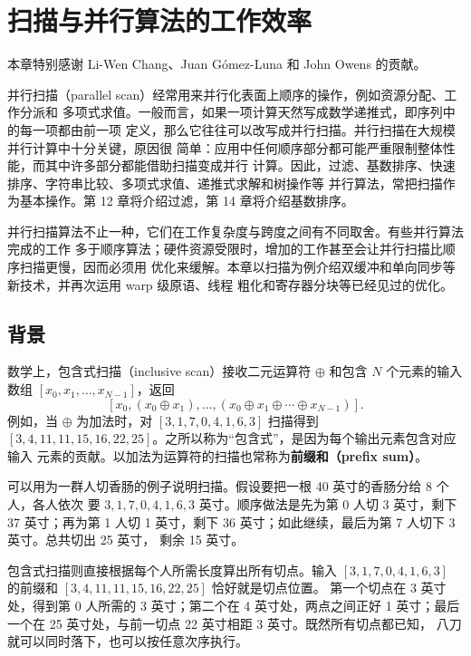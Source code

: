 \chapter{扫描与并行算法的工作效率}
\label{chap:scan}
\chaptercontents

\setcounter{footnote}{0}

本章特别感谢 Li-Wen Chang、Juan G\'omez-Luna 和 John Owens 的贡献。

并行扫描（parallel scan）经常用来并行化表面上顺序的操作，例如资源分配、工作分派和
多项式求值。一般而言，如果一项计算天然写成数学递推式，即序列中的每一项都由前一项
定义，那么它往往可以改写成并行扫描。并行扫描在大规模并行计算中十分关键，原因很
简单：应用中任何顺序部分都可能严重限制整体性能，而其中许多部分都能借助扫描变成并行
计算。因此，过滤、基数排序、快速排序、字符串比较、多项式求值、递推式求解和树操作等
并行算法，常把扫描作为基本操作。第 12 章将介绍过滤，第 14 章将介绍基数排序。

并行扫描算法不止一种，它们在工作复杂度与跨度之间有不同取舍。有些并行算法完成的工作
多于顺序算法；硬件资源受限时，增加的工作甚至会让并行扫描比顺序扫描更慢，因而必须用
优化来缓解。本章以扫描为例介绍双缓冲和单向同步等新技术，并再次运用 warp 级原语、线程
粗化和寄存器分块等已经见过的优化。

\section{背景}
\label{sec:scan-background}

数学上，包含式扫描（inclusive scan）接收二元运算符 $\oplus$ 和包含 $N$ 个元素的输入
数组 $[x_0,x_1,\ldots,x_{N-1}]$，返回
\[
 [x_0,(x_0\oplus x_1),\ldots,(x_0\oplus x_1\oplus\cdots\oplus x_{N-1})].
\]
例如，当 $\oplus$ 为加法时，对 $[3,1,7,0,4,1,6,3]$ 扫描得到
$[3,4,11,11,15,16,22,25]$。之所以称为“包含式”，是因为每个输出元素包含对应输入
元素的贡献。以加法为运算符的扫描也常称为\textbf{前缀和（prefix sum）}。

可以用为一群人切香肠的例子说明扫描。假设要把一根 40 英寸的香肠分给 8 个人，各人依次
要 $3,1,7,0,4,1,6,3$ 英寸。顺序做法是先为第 0 人切 3 英寸，剩下 37 英寸；再为第 1
人切 1 英寸，剩下 36 英寸；如此继续，最后为第 7 人切下 3 英寸。总共切出 25 英寸，
剩余 15 英寸。

包含式扫描则直接根据每个人所需长度算出所有切点。输入
$[3,1,7,0,4,1,6,3]$ 的前缀和 $[3,4,11,11,15,16,22,25]$ 恰好就是切点位置。
第一个切点在 3 英寸处，得到第 0 人所需的 3 英寸；第二个在 4 英寸处，两点之间正好
1 英寸；最后一个在 25 英寸处，与前一切点 22 英寸相距 3 英寸。既然所有切点都已知，
八刀就可以同时落下，也可以按任意次序执行。

